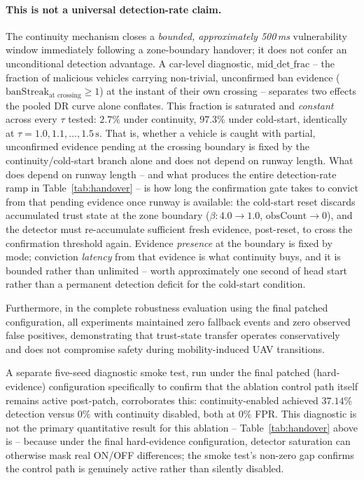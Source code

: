 \documentclass[journal]{IEEEtran}
\begin{document}
\paragraph{This is not a universal detection-rate claim.} The
continuity mechanism closes a \emph{bounded, approximately 500\,ms}
vulnerability window immediately following a zone-boundary handover; it
does not confer an unconditional detection advantage. A car-level
diagnostic, $\mathrm{mid\_det\_frac}$ -- the fraction of malicious vehicles
carrying non-trivial, unconfirmed ban evidence
($\mathrm{banStreak}_{\text{at crossing}} \geq 1$) at the instant of their
own crossing -- separates two effects the pooled DR curve alone conflates.
This fraction is saturated and \emph{constant} across every $\tau$ tested:
$2.7\%$ under continuity, $97.3\%$ under cold-start, identically at
$\tau = 1.0, 1.1, \ldots, 1.5\,\mathrm{s}$. That is, whether a vehicle is
caught with partial, unconfirmed evidence pending at the crossing boundary
is fixed by the continuity/cold-start branch alone and does not depend on
runway length. What does depend on runway length -- and what produces the
entire detection-rate ramp in Table~\ref{tab:handover} -- is how long the
confirmation gate takes to convict from that pending evidence once runway
is available: the cold-start reset discards accumulated trust state at the
zone boundary ($\beta:4.0\rightarrow1.0$,
$\mathrm{obsCount}\rightarrow0$), and the detector must re-accumulate
sufficient fresh evidence, post-reset, to cross the confirmation threshold
again. Evidence \emph{presence} at the boundary is fixed by mode;
conviction \emph{latency} from that evidence is what continuity buys, and
it is bounded rather than unlimited -- worth approximately one second of
head start rather than a permanent detection deficit for the cold-start
condition.

Furthermore, in the complete robustness evaluation using the final patched
configuration, all experiments maintained zero fallback events and zero
observed false positives, demonstrating that trust-state transfer operates
conservatively and does not compromise safety during mobility-induced UAV
transitions.

A separate five-seed diagnostic smoke test, run under the final patched
(hard-evidence) configuration specifically to confirm that the ablation
control path itself remains active post-patch, corroborates this:
continuity-enabled achieved $37.14\%$ detection versus $0\%$ with
continuity disabled, both at $0\%$ FPR. This diagnostic is not the
primary quantitative result for this ablation -- Table~\ref{tab:handover}
above is -- because under the final hard-evidence configuration, detector
saturation can otherwise mask real ON/OFF differences; the smoke test's
non-zero gap confirms the control path is genuinely active rather than
silently disabled.
\end{document}
